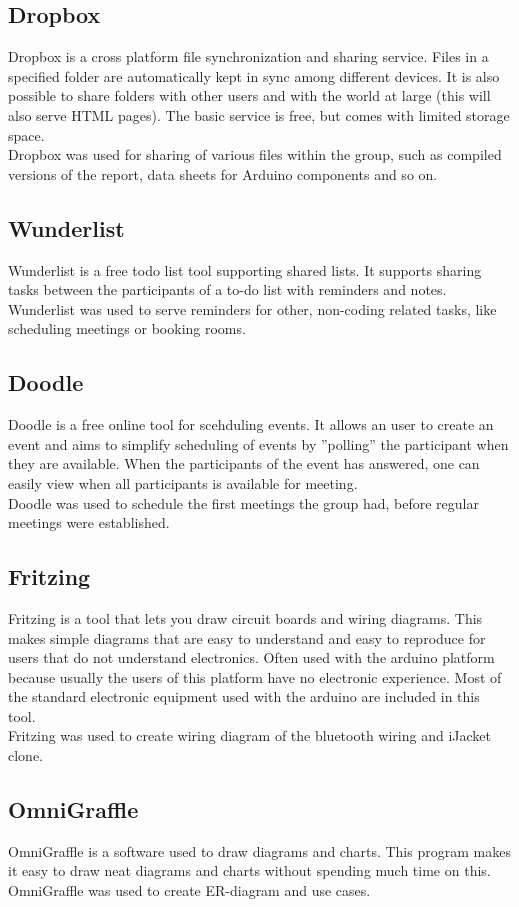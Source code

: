 \subsection{Dropbox}
Dropbox is a cross platform file synchronization and sharing service. Files in a specified folder are automatically kept in sync among different devices. It is also possible to share folders with other users and with the world at large (this will also serve HTML pages). The basic service is free, but comes with limited storage space.\\
Dropbox was used for sharing of various files within the group, such as compiled versions of the report, data sheets for Arduino components and so on. 

\subsection{Wunderlist}
Wunderlist is a free todo list tool supporting shared lists. It supports sharing tasks between the participants of a to-do list with reminders and notes.\\
Wunderlist was used to serve reminders for other, non-coding related tasks, like scheduling meetings or booking rooms.

\subsection{Doodle}
Doodle is a free online tool for scehduling events. It allows an user to create an event and aims to simplify scheduling of events by ''polling'' the participant when they are available. When the participants of the event has answered, one can easily view when all participants is available for meeting.\\
Doodle was used to schedule the first meetings the group had, before regular meetings were established. 

\subsection{Fritzing}
Fritzing is a tool that lets you draw circuit boards and wiring diagrams. This makes simple diagrams that are easy to understand and easy to reproduce for users that do not understand electronics. Often used with the arduino platform because usually the users of this platform have no electronic experience. Most of the standard electronic equipment used with the arduino are included in this tool.\\
Fritzing was used to create wiring diagram of the bluetooth wiring and iJacket clone.

\subsection{OmniGraffle}
OmniGraffle is a software used to draw diagrams and charts. This program makes it easy to draw neat diagrams and charts without spending much time on this.\\
OmniGraffle was used to create ER-diagram and use cases.
